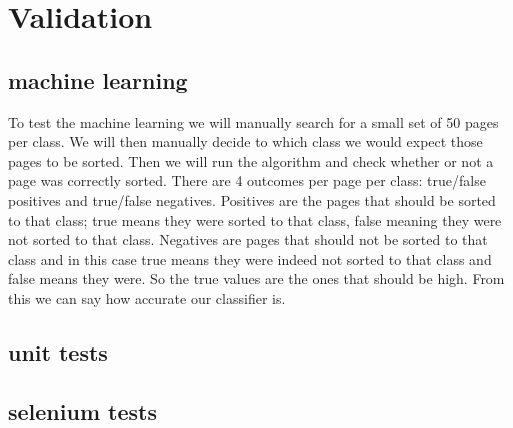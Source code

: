 \section{Validation}

\subsection {machine learning}
To test the machine learning we will manually search for a small set of 50 pages per class. We will then manually decide to which class we would expect those pages to be sorted. Then we will run the algorithm and check whether or not a page was correctly sorted. There are 4 outcomes per page per class: true/false positives and true/false negatives. Positives are the pages that should be sorted to that class; true means they were sorted to that class, false meaning they were not sorted to that class. Negatives are pages that should not be sorted to that class and in this case true means they were indeed not sorted to that class and false means they were. So the true values are the ones that should be high. From this we can say how accurate our classifier is.

\subsection{unit tests}

\subsection{selenium tests}

